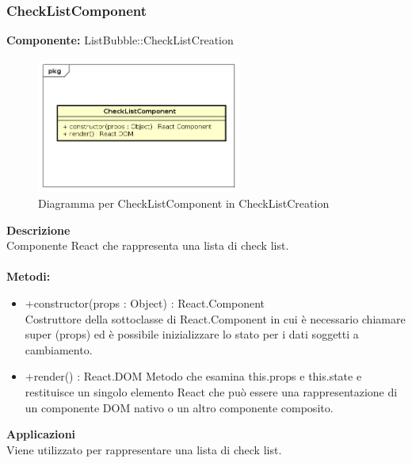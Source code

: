 \subsubsection{CheckListComponent}
\textbf{Componente:}  ListBubble::CheckListCreation\\
   \FloatBarrier
   \begin{figure}[ht]
   \centering
   \includegraphics[width=0.6\textwidth]{img/single-CheckListComponent}
   \caption{{Diagramma per CheckListComponent in CheckListCreation}}
\end{figure}
\FloatBarrier
\textbf{Descrizione}\\
Componente React che rappresenta una lista di check list.
\\
\\
\textbf{Metodi:} 
\begin{itemize}
\item +constructor(props : Object) : React.Component 
\\
Costruttore della sottoclasse di React.Component in cui è necessario chiamare super (props) ed è possibile inizializzare lo stato per i dati soggetti a cambiamento.

\item +render() : React.DOM
Metodo che esamina this.props e this.state e restituisce un singolo elemento React che può essere una rappresentazione di un componente DOM nativo o un altro componente composito.

\end{itemize} 


\textbf{Applicazioni}\\
Viene utilizzato per rappresentare una lista di check list. 


\clearpage

